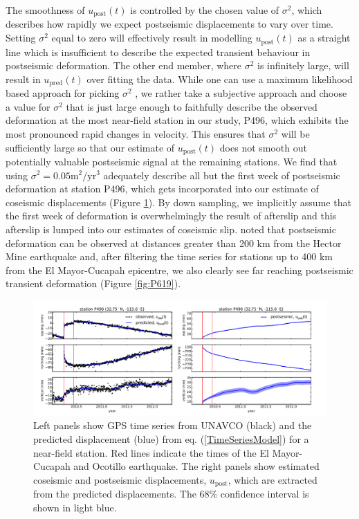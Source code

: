 \documentclass[review]{elsarticle}
\begin{document}
The smoothness of $u_\mathrm{post}(t)$ is controlled by the chosen value of $\sigma^2$, which describes how rapidly we expect postseismic displacements to vary over time.  Setting $\sigma^2$ equal to zero will effectively result in modelling $u_\mathrm{post}(t)$ as a straight line which is insufficient to describe the expected transient behaviour in postseismic deformation. The other end member, where $\sigma^2$ is infinitely large, will result in $u_\mathrm{pred}(t)$ over fitting the data. While one can use a maximum likelihood based approach for picking $\sigma^2$ \citep[e.g.][]{Segall1997}, we rather take a subjective approach and choose a value for $\sigma^2$ that is just large enough to faithfully describe the observed deformation at the most near-field station in our study, P496, which exhibits the most pronounced rapid changes in velocity. This ensures that $\sigma^2$ will be sufficiently large so that our estimate of $u_\mathrm{post}(t)$ does not smooth out potentially valuable postseismic signal at the remaining stations. We find that using $\sigma^2 = 0.05 \mathrm{m}^2 / \mathrm{yr}^3$ adequately describe all but the first week of postseismic deformation at station P496, which gets incorporated into our estimate of coseismic displacements (Figure \ref{fig:P496}). By down sampling, we implicitly assume that the first week of deformation is overwhelmingly the result of afterslip and this afterslip is lumped into our estimates of coseismic slip. \citet{Freed2007a} noted that postseismic deformation can be observed at distances greater than 200 km from the Hector Mine earthquake and, after filtering the time series for stations up to 400 km from the El Mayor-Cucapah epicentre, we also clearly see far reaching postseismic transient deformation (Figure \ref{fig:P619}).      

\begin{figure}
\includegraphics[scale=0.7]{Figures/FilterP496}
\centering
\caption{Left panels show GPS time series from UNAVCO (black) and the predicted displacement (blue) from eq. (\ref{TimeSeriesModel}) for a near-field station.  Red lines indicate the times of the El Mayor-Cucapah and Ocotillo earthquake. The right panels show estimated coseismic and postseismic displacements, $u_\mathrm{post}$, which are extracted from the predicted displacements.  The 68\% confidence interval is shown in light blue.}
\label{fig:P496}
\end{figure}
\end{document}
